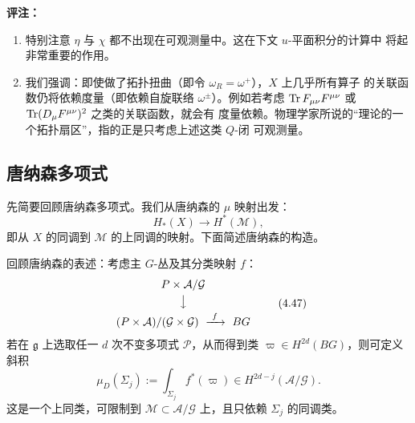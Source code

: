 \textbf{评注：}

\begin{enumerate}[label=\arabic*., leftmargin=2.2em]
  \item 特别注意 $\eta$ 与 $\chi$ 都不出现在可观测量中。这在下文 $u$-平面积分的计算中
    将起非常重要的作用。

  \item 我们强调：即使做了拓扑扭曲（即令 $\omega_{R}=\omega^{+}$），$X$ 上几乎所有算子
    的关联函数仍将依赖度量（即依赖自旋联络 $\omega^{\pm}$）。例如若考虑
    $\operatorname{Tr} F_{\mu\nu}F^{\mu\nu}$ 或 $\operatorname{Tr}(D_{\mu}F^{\mu\nu})^{2}$ 之类的关联函数，就会有
    度量依赖。物理学家所说的“理论的一个拓扑扇区”，指的正是只考虑上述这类 $Q$-闭
    可观测量。
\end{enumerate}


\subsection{唐纳森多项式}
\label{sec:4-5}

先简要回顾唐纳森多项式。我们从唐纳森的 $\mu$ 映射出发：
\begin{equation}
  H_{*}(X)\to H^{*}(\mathcal{M}),
  \tag{4.46}
\end{equation}
即从 $X$ 的同调到 $\mathcal{M}$ 的上同调的映射。下面简述唐纳森的构造。

回顾唐纳森的表述：考虑主 $G$-丛及其分类映射 $f$：
\begin{equation}
  \begin{array}{c}
    P\times\mathcal{A}/\mathcal{G}\\[3pt]
    \big\downarrow\\[3pt]
    (P\times\mathcal{A})/(\mathcal{G}\times\mathcal{G})
    \ \xrightarrow{\ f\ }\ BG
  \end{array}
  \tag{4.47}
\end{equation}
若在 $\mathfrak{g}$ 上选取任一 $d$ 次不变多项式 $\mathcal{P}$，从而得到类
$\varpi\in H^{2d}(BG)$，则可定义斜积
\begin{equation}
  \mu_{D}(\Sigma_{j}):=\int_{\Sigma_{j}}f^{*}(\varpi)
  \in H^{2d-j}(\mathcal{A}/\mathcal{G}).
  \tag{4.48}
\end{equation}
这是一个上同类，可限制到 $\mathcal{M}\subset\mathcal{A}/\mathcal{G}$ 上，且只依赖
$\Sigma_{j}$ 的同调类。

